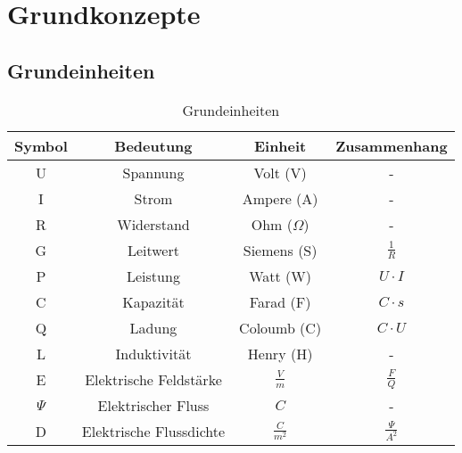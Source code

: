 \chapter{Grundkonzepte}

\section{Grundeinheiten}
\begin{table}[!htb]
    \centering
    \begin{tabular}{|c|c|c|c|}
        \hline
        \textbf{Symbol} & \textbf{Bedeutung}        & \textbf{Einheit} & \textbf{Zusammenhang} \\ \hline
        U               & Spannung                  & Volt (V)         & -                     \\
        I               & Strom                     & Ampere (A)       & -                     \\
        R               & Widerstand                & Ohm ($\Omega$)   & -                     \\
        G               & Leitwert                  & Siemens (S)      & $\frac{1}{R}$         \\
        P               & Leistung                  & Watt (W)         & $U\cdot I$            \\
        C               & Kapazität                 & Farad (F)        & $C\cdot s$            \\
        Q               & Ladung                    & Coloumb (C)      & $C \cdot U$           \\
        L               & Induktivität              & Henry (H)        & -                     \\ \hline
        E               & Elektrische Feldstärke    & $\frac{V}{m}$    & $\frac{F}{Q}$         \\
        $\Psi$          & Elektrischer Fluss        & $C$              & -                     \\
        D               & Elektrische Flussdichte   & $\frac{C}{m^2}$  & $\frac{\Psi}{A^2}$    \\ \hline
    \end{tabular}
    \caption{Grundeinheiten}
    \label{Grundkonzepte/Einheiten/Tabelle}
\end{table}

